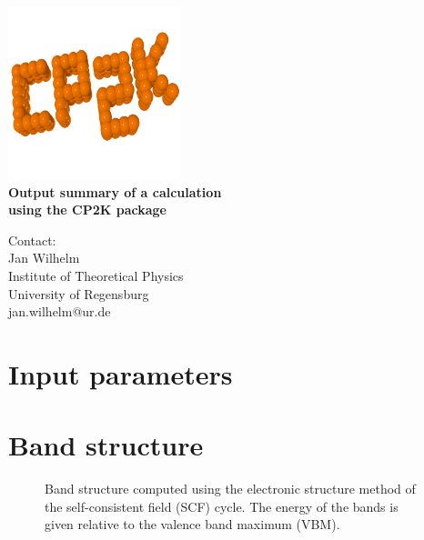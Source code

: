 \documentclass[11pt, a4paper]{scrartcl}
\newlength\figureheight
\newlength\figurewidth
\begin{document}

\begin{titlepage}
  \sffamily
  \begin{center}
{
\includegraphics[width=5cm]{cp2k_logo.png}
\\[1em]
\Huge \bfseries Output summary of a \GW calculation\\[0.4em] using the CP2K package}
  \end{center}{\large
  \vspace{3em}
  Contact:
  \\[1em]
    Jan Wilhelm
      \\[0.5em]
    Institute of Theoretical Physics
    \\[0.5em]
    University of Regensburg
    \\[0.5em]
    jan.wilhelm@ur.de
    \\[3em]
    
\tableofcontents
  }
\end{titlepage}







\pagestyle{plain}






\pagestyle{fancy}

\section{Input parameters}


\section{Band structure}
\begin{figure}[h!]
\centering
\setlength\figureheight{12cm} 
\setlength\figurewidth{\textwidth}

\caption{Band structure computed using the electronic structure method of the self-consistent field (SCF) cycle. The energy of the bands is given relative to the valence band maximum (VBM).}
    \label{fig:Efield}
\end{figure}
\end{document}
